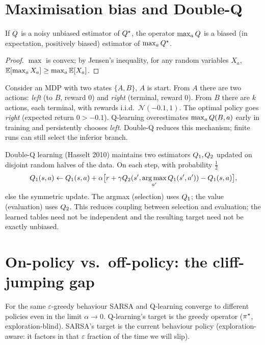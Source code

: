 \documentclass[11pt,oneside]{scrbook}
\begin{document}
\section{Maximisation bias and Double-Q}

\begin{proposition}
\label{prop:max-bias}
If $Q$ is a noisy unbiased estimator of $Q^{\star}$, the operator $\max_a Q$ is a
biased (in expectation, positively biased) estimator of $\max_a Q^{\star}$.
\end{proposition}

\begin{proof}
$\max$ is convex; by Jensen's inequality, for any random variables $X_a$,
$\mathbb{E}[\max_a X_a] \ge \max_a \mathbb{E}[X_a]$.
\end{proof}

\begin{example}
Consider an MDP with two states $\{A, B\}$, $A$ is start. From $A$ there are two actions:
\emph{left} (to $B$, reward 0) and \emph{right} (terminal, reward 0). From $B$ there are
$k$ actions, each terminal, with rewards i.i.d.\ $\mathcal{N}(-0.1, 1)$. The optimal policy
goes \emph{right} (expected return $0 > -0.1$). Q-learning overestimates $\max_a Q(B,a)$
early in training and persistently chooses \emph{left}. Double-Q reduces this mechanism; finite runs can still select the inferior branch.
\end{example}

Double-Q learning (Hasselt 2010) maintains two estimators $Q_1, Q_2$ updated on
disjoint random halves of the data. On each step, with probability $\tfrac{1}{2}$
\[
  Q_1(s,a) \leftarrow Q_1(s,a) + \alpha\bigl[r + \gamma Q_2(s', \operatorname*{arg\,max}_{a'} Q_1(s',a')) - Q_1(s,a)\bigr],
\]
else the symmetric update. The argmax (selection) uses $Q_1$; the value (evaluation)
uses $Q_2$. This reduces coupling between selection and evaluation;
the learned tables need not be independent and the resulting target need
not be exactly unbiased.

\section{On-policy vs.\ off-policy: the cliff-jumping gap}

For the same $\varepsilon$-greedy behaviour SARSA and Q-learning converge to different
policies even in the limit $\alpha \to 0$. Q-learning's target is the greedy operator
($\pi^{\star}$, exploration-blind). SARSA's target is the current behaviour policy
(exploration-aware: it factors in that $\varepsilon$ fraction of the time we will slip).
\end{document}
